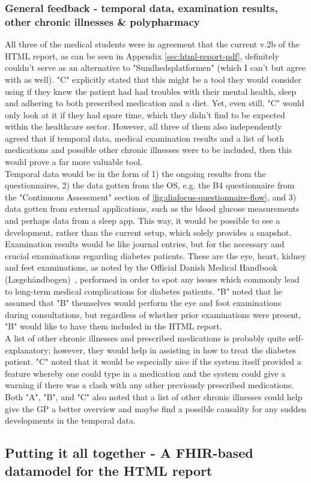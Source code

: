 \subsubsection*{General feedback - temporal data, examination results, other chronic illnesses \& polypharmacy}
All three of the medical students were in agreement that the current v.2b of the HTML report, as can be seen in Appendix \autoref{sec:html-report-pdf}, definitely couldn't serve as an alternative to "Sundhedsplatformen" (which I can't but agree with as well). "C" explicitly stated that this might be a tool they would consider using if they knew the patient had had troubles with their mental health, sleep and adhering to both prescribed medication and a diet. Yet, even still, "C" would only look at it if they had spare time, which they didn't find to be expected within the healthcare sector. However, all three of them also independently agreed that if temporal data, medical examination results and a list of both medications and possible other chronic illnesses were to be included, then this would prove a far more valuable tool.
\\
Temporal data would be in the form of 1) the ongoing results from the questionnaires, 2) the data gotten from the OS, e.g. the B4 questionnaire from the "Continuous Assessment" section of \autoref{fig:diafocus-questionnaire-flow}, and 3) data gotten from external applications, such as the blood glucose measurements and perhaps data from a sleep app. This way, it would be possible to see a development, rather than the current setup, which solely provides a snapshot.
\\
Examination results would be like journal entries, but for the necessary and crucial examinations regarding diabetes patients. These are the eye, heart, kidney and feet examinations, as noted by the Official Danish Medical Handbook (Lægehåndbogen)~\cite{SundhedDK-diabetes}, performed in order to spot any issues which commonly lead to long-term medical complications for diabetes patients. "B" noted that he assumed that "B" themselves would perform the eye and foot examinations during consultations, but regardless of whether prior examinations were present, "B" would like to have them included in the HTML report. 
\\
A list of other chronic illnesses and prescribed medications is probably quite self-explanatory; however, they would help in assisting in how to treat the diabetes patient. "C" noted that it would be especially nice if the system itself provided a feature whereby one could type in a medication and the system could give a warning if there was a clash with any other previously prescribed medications. Both "A", "B", and "C" also noted that a list of other chronic illnesses could help give the GP a better overview and maybe find a possible causality for any sudden developments in the temporal data.

\subsection{Putting it all together - A FHIR-based datamodel for the HTML report}
